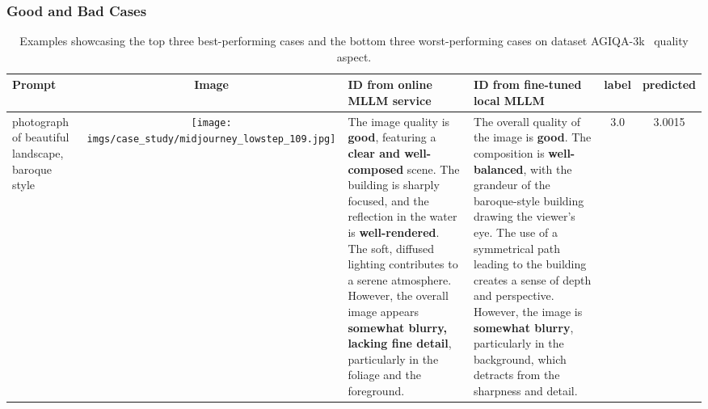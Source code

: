 \subsubsection{Good and Bad Cases}
\begin{table*}
    \centering
    \caption{Examples showcasing the top three best-performing cases and the bottom three worst-performing cases on dataset AGIQA-3k~\cite{li2023agiqa} quality aspect.}\label{tab:badngoodcases}
    \begin{tabular}{m{2cm}c m{4cm}m{4cm}cc}
        \toprule
        Prompt &
        Image & ID from online MLLM service & ID from fine-tuned local MLLM & label & predicted \\
        \midrule
        photograph of beautiful landscape, baroque style &
        \begin{minipage}{.2\textwidth}
            \texttt{[image: imgs/case\_study/midjourney\_lowstep\_109.jpg]}
        \end{minipage} & 
        The image quality is \textcolor{positive}{\textbf{good}}, featuring a \textcolor{positive}{\textbf{clear and well-composed}} scene. The building is sharply focused, and the reflection in the water is \textcolor{positive}{\textbf{well-rendered}}. The soft, diffused lighting contributes to a serene atmosphere. However, the overall image appears \textcolor{negative}{\textbf{somewhat blurry, lacking fine detail}}, particularly in the foliage and the foreground. & 
        The overall quality of the image is \textcolor{positive}{\textbf{good}}. The composition is \textcolor{positive}{\textbf{well-balanced}}, with the grandeur of the baroque-style building drawing the viewer's eye. The use of a symmetrical path leading to the building creates a sense of depth and perspective. However, the image is \textcolor{negative}{\textbf{somewhat blurry}}, particularly in the background, which detracts from the sharpness and detail. &
        3.0 & 3.0015\\


\end{tabular}
\end{table*}
